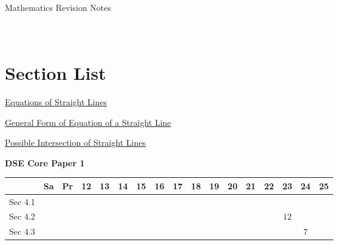 \documentclass[12pt, a4paper]{article}
\begin{document}
\newpage
\newpage
\thispagestyle{empty}
\begin{center}
Mathematics Revision Notes\\\vspace{1cm}
\\\vspace{1cm}
{\fontsize{24pt}{24pt}\selectfont {Equations of Straight Lines}} \\\vspace{1cm}
\label{chapter:S4-4}

\end{center}
\vspace{0.5cm}
\hline
\section*{Section List}
\begin{enumx}[label=Sec 4.\arabic*\ ]
\item \hyperref[section:4-4-1]{Equations of Straight Lines}
\item \hyperref[section:4-4-2]{General Form of Equation of a Straight Line}
\item \hyperref[section:4-4-3]{Possible Intersection of Straight Lines}
\end{enumx}
\begin{absolutelynopagebreak}
\begin{center}
\textbf{DSE Core Paper 1}
\end{center}
\begin{center}
\begin{tabular}{|l|c|c|c|c|c|c|c|c|c|c|c|c|c|c|c|c|}
\hline
        & Sa & Pr & 12 & 13 & 14 & 15 & 16 & 17 & 18 & 19 & 20 & 21 & 22 & 23 & 24 & 25 \\\hline\hline
Sec 4.1 &  &  &  &  &  &  &  &  &  &  &  &  &  &  &  &  \\\hline
Sec 4.2 &  &  &  &  &  &  &  &  &  &  &  &  &  &  $12$ &  &  \\\hline
Sec 4.3 &  &  &  &  &  &  &  &  &  &  &  &  &  &  &  $7$ &  \\\hline
\end{tabular}
\end{center}
\end{absolutelynopagebreak}
\end{document}
